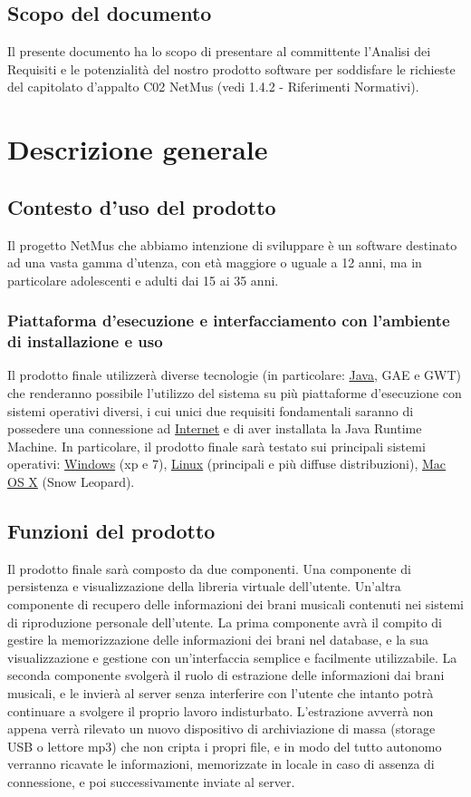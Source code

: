 \section{Scopo del documento}
Il presente documento ha lo scopo di presentare al committente l'Analisi dei
Requisiti e le potenzialit\`a del nostro prodotto software per soddisfare le
richieste del capitolato d'appalto C02 NetMus (vedi 1.4.2 - Riferimenti
Normativi).



\chapter{Descrizione generale}
\thispagestyle{fancy}

\section{Contesto d'uso del prodotto}
Il progetto NetMus che abbiamo intenzione di sviluppare \`e un software
destinato ad una vasta gamma d'utenza, con et\`a maggiore o uguale
a 12 anni, ma in particolare adolescenti e adulti dai 15 ai 35 anni.

\subsection{Piattaforma d'esecuzione e interfacciamento con l'ambiente di
installazione e uso}
Il prodotto finale utilizzer\`a diverse tecnologie (in particolare: \underline{Java}, GAE e
GWT) che renderanno possibile l'utilizzo del sistema su pi\`u piattaforme
d'esecuzione con sistemi operativi diversi, i cui unici due requisiti
fondamentali saranno di possedere una connessione ad \underline{Internet} e di aver
installata la Java Runtime Machine. In particolare, il prodotto finale sar\`a
testato sui principali sistemi operativi: \underline{Windows} (xp e 7), \underline{Linux} (principali e
pi\`u diffuse distribuzioni), \underline{Mac OS X} (Snow Leopard).
\section{Funzioni del prodotto}
Il prodotto finale sar\`a composto da due componenti. Una componente di
persistenza e visualizzazione della libreria virtuale dell'utente. Un'altra
componente di recupero delle informazioni dei brani musicali contenuti nei
sistemi di riproduzione personale dell'utente. La prima componente avr\`a il
compito di gestire la memorizzazione delle informazioni dei brani nel database,
e la sua visualizzazione e gestione con un'interfaccia semplice e facilmente
utilizzabile. La seconda componente svolger\`a il ruolo di estrazione delle
informazioni dai brani musicali, e le invier\`a al server senza interferire con
l'utente che intanto potr\`a continuare a svolgere il proprio lavoro indisturbato.
L'estrazione avverr\`a non appena verr\`a rilevato un nuovo dispositivo di
archiviazione di massa (storage USB o lettore mp3) che non cripta i propri file,
e in modo del tutto autonomo verranno ricavate le informazioni, memorizzate in
locale in caso di assenza di connessione, e poi successivamente inviate al server.


